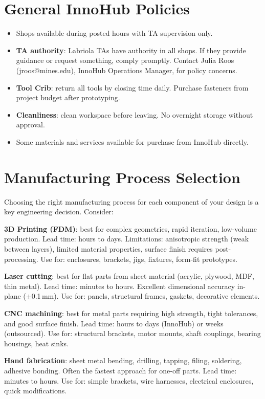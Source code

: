 \section{General InnoHub Policies}
\begin{itemize}[nosep,leftmargin=1.5em]
\item Shops available during posted hours with TA supervision only.
\item \textbf{TA authority}: Labriola TAs have authority in all shops. If they provide guidance or request something, comply promptly. Contact Julia Roos (jroos@mines.edu), InnoHub Operations Manager, for policy concerns.
\item \textbf{Tool Crib}: return all tools by closing time daily. Purchase fasteners from project budget after prototyping.
\item \textbf{Cleanliness}: clean workspace before leaving. No overnight storage without approval.
\item Some materials and services available for purchase from InnoHub directly.
\end{itemize}


\section{Manufacturing Process Selection}
Choosing the right manufacturing process for each component of your design is a key engineering decision. Consider:

\textbf{3D Printing (FDM)}: best for complex geometries, rapid iteration, low-volume production. Lead time: hours to days. Limitations: anisotropic strength (weak between layers), limited material properties, surface finish requires post-processing. Use for: enclosures, brackets, jigs, fixtures, form-fit prototypes.

\textbf{Laser cutting}: best for flat parts from sheet material (acrylic, plywood, MDF, thin metal). Lead time: minutes to hours. Excellent dimensional accuracy in-plane ($\pm$0.1\,mm). Use for: panels, structural frames, gaskets, decorative elements.

\textbf{CNC machining}: best for metal parts requiring high strength, tight tolerances, and good surface finish. Lead time: hours to days (InnoHub) or weeks (outsourced). Use for: structural brackets, motor mounts, shaft couplings, bearing housings, heat sinks.

\textbf{Hand fabrication}: sheet metal bending, drilling, tapping, filing, soldering, adhesive bonding. Often the fastest approach for one-off parts. Lead time: minutes to hours. Use for: simple brackets, wire harnesses, electrical enclosures, quick modifications.

